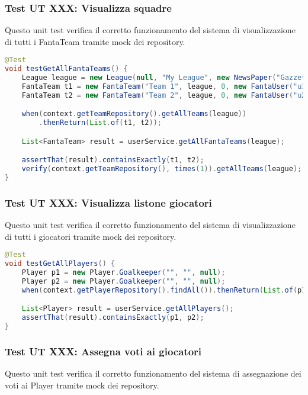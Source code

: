 \subsubsection{Test UT XXX: Visualizza squadre}

Questo unit test verifica il corretto funzionamento del sistema di visualizzazione di tutti i FantaTeam 
tramite mock dei repository.

\begin{lstlisting}[language=Java]
@Test
void testGetAllFantaTeams() {
    League league = new League(null, "My League", new NewsPaper("Gazzetta"), "L999");
	FantaTeam t1 = new FantaTeam("Team 1", league, 0, new FantaUser("u1", "pwd"), Set.of());
	FantaTeam t2 = new FantaTeam("Team 2", league, 0, new FantaUser("u2", "pwd"), Set.of());

	when(context.getTeamRepository().getAllTeams(league))
        .thenReturn(List.of(t1, t2));

	List<FantaTeam> result = userService.getAllFantaTeams(league);

	assertThat(result).containsExactly(t1, t2);
	verify(context.getTeamRepository(), times(1)).getAllTeams(league);
}
\end{lstlisting}


\subsubsection{Test UT XXX: Visualizza listone giocatori}

Questo unit test verifica il corretto funzionamento del sistema di visualizzazione di tutti i giocatori 
tramite mock dei repository.

\begin{lstlisting}[language=Java]
@Test
void testGetAllPlayers() {
	Player p1 = new Player.Goalkeeper("", "", null);
	Player p2 = new Player.Goalkeeper("", "", null);
	when(context.getPlayerRepository().findAll()).thenReturn(List.of(p1, p2));

	List<Player> result = userService.getAllPlayers();
	assertThat(result).containsExactly(p1, p2);
}
\end{lstlisting}


\subsubsection{Test UT XXX: Assegna voti ai giocatori}

Questo unit test verifica il corretto funzionamento del sistema di assegnazione dei voti ai Player tramite mock dei repository.

